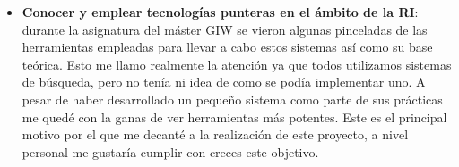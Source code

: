 \begin{itemize}
	\item \textbf{Conocer y emplear tecnologías punteras en el ámbito de la \acrshort{RI}}: durante la asignatura del máster \acrfull{GIW} se vieron algunas pinceladas de las herramientas empleadas para llevar a cabo estos sistemas así como su base teórica. Esto me llamo realmente la atención ya que todos utilizamos sistemas de búsqueda, pero no tenía ni idea de como se podía implementar uno. A pesar de haber desarrollado un pequeño sistema como parte de sus prácticas me quedé con la ganas de ver herramientas más potentes. Este es el principal motivo por el que me decanté a la realización de este proyecto, a nivel personal me gustaría cumplir con creces este objetivo.
\end{itemize}